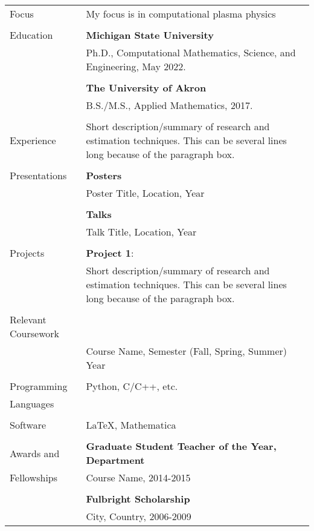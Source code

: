 \noindent \begin{tabular}{@{} l l}
 \Large{Focus} & My focus is in computational plasma physics\\
     & \\
 \Large{Education}    & \textbf{Michigan State University} \\
     & Ph.D., Computational Mathematics, Science, and Engineering, May 2022. \\
     & \\
     & \textbf{The University of Akron} \\
     & B.S./M.S., Applied Mathematics, 2017. \\
     & \\
 \Large{Experience}    & {\parbox{4.3in}{ \vspace{1.2em} Short description/summary of research and estimation techniques. This can be several lines long because of the paragraph box.}}\\
    & \\
  \Large{Presentations}   & \textbf{Posters} \\
     & Poster Title, Location, Year\\
     & \\
     &\textbf{Talks} \\
     & Talk Title, Location, Year\\
     & \\
  \Large{Projects}   & \textbf{Project 1}: \\
     & {\parbox{4.3in}{Short description/summary of research and estimation techniques. This can be several lines long because of the paragraph box.}}\\
     & \\
  \Large{Relevant Coursework }    & \\
     & Course Name, Semester (Fall, Spring, Summer) Year \\
     & \\
  \Large{Programming}   & Python, C/C++, etc. \\
  \Large{Languages}& \\
  &\\
  \Large{Software}    & \LaTeX, Mathematica  \\
  &\\
 \Large{Awards and }    & \textbf{Graduate Student Teacher of the Year, Department} \\
  \Large{Fellowships}   & Course Name, 2014-2015 \\
     & \\
     & \textbf{Fulbright Scholarship} \\
     & City, Country, 2006-2009 \\
\end{tabular}